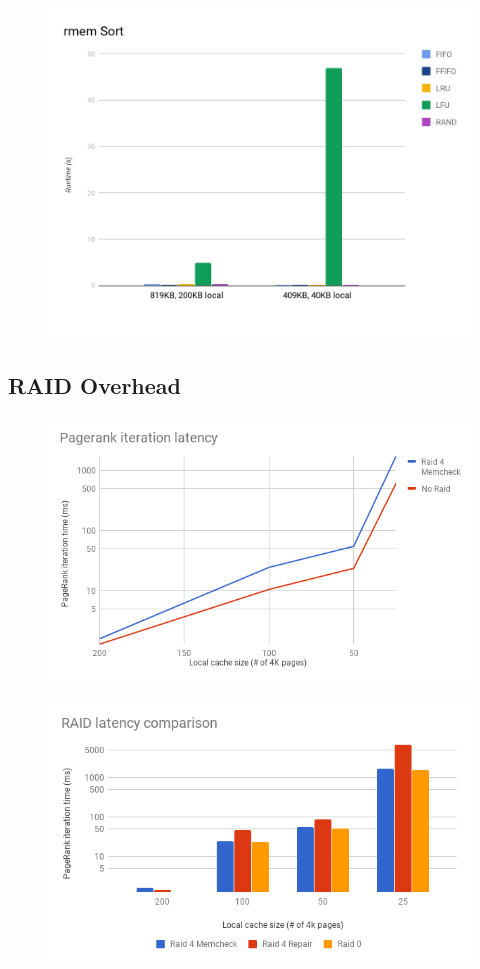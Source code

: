 \begin{figure}[H]
    \includegraphics[width=\columnwidth]{fig/sortPerformance}
    \caption{\todo{}}
    \label{fig:sortPerformance}
\end{figure}

\subsection{RAID Overhead}

\begin{figure}[H]
    \includegraphics[width=\columnwidth]{fig/Raid4Overhead}
    \caption{\todo{}}
    \label{fig:raid4Overhead}
\end{figure}

\begin{figure}[H]
    \includegraphics[width=\columnwidth]{fig/RaidComparison}
    \caption{\todo{}}
    \label{fig:RaidComparison}
\end{figure}

